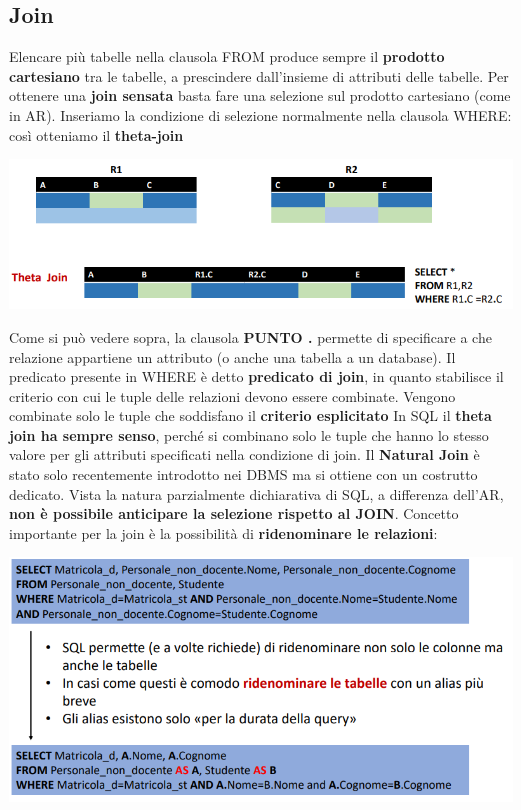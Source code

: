 \documentclass[12pt]{article}
\begin{document}
\subsection{Join}
Elencare più tabelle nella clausola FROM produce sempre il \textbf{prodotto cartesiano} tra le tabelle, a prescindere dall'insieme di attributi delle tabelle.
Per ottenere una \textbf{join sensata} basta fare una selezione sul prodotto cartesiano (come in AR).
Inseriamo la condizione di selezione normalmente nella clausola WHERE: così otteniamo il \textbf{theta-join}
\begin{center}
    \includegraphics[width = 1\textwidth]{Images/197.PNG}
\end{center}
Come si può vedere sopra, la clausola \textbf{PUNTO .} permette di specificare a che relazione appartiene un attributo (o anche una tabella a un database).
Il predicato presente in WHERE è detto \textbf{predicato di join}, in quanto stabilisce il criterio con cui le tuple delle relazioni devono essere combinate.
Vengono combinate solo le tuple che soddisfano il \textbf{criterio esplicitato}
In SQL il \textbf{theta join ha sempre senso}, perché si combinano solo le tuple che hanno lo stesso valore per gli attributi specificati nella condizione di join.
Il \textbf{Natural Join} è stato solo recentemente introdotto nei DBMS ma si ottiene con un costrutto dedicato.
Vista la natura parzialmente dichiarativa di SQL, a differenza dell'AR, \textbf{non è possibile anticipare la selezione rispetto al JOIN}.
Concetto importante per la join è la possibilità di \textbf{ridenominare le relazioni}:
\begin{center}
    \includegraphics[width = 1\textwidth]{Images/198.PNG}
\end{center}
\end{document}
